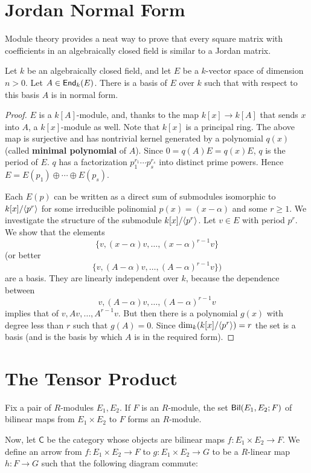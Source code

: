 \appendix 
\section{Jordan Normal Form}
Module theory provides a neat way to prove that every square matrix with coefficients in an algebraically closed field is similar to a Jordan matrix.  

\begin{thm}
Let $k$ be an algebraically closed field, and let $E$ be a $k$-vector space of dimension $n>0$. 
Let $A \in \operatorname{\sf{End}}_{k}(E)$. 
There is a basis of $E$ over $k$ such that with respect to this basis $A$ is in normal form. 

\begin{proof}
$E$ is a $k[A]$-module, and, thanks to the map $k[x] \to k[A]$ that sends $x$ into $A$, a $k[x]$-module as well. 
Note that $k[x]$ is a principal ring. The above map is surjective and has nontrivial kernel generated by a polynomial $q(x)$ (called \textbf{minimal polynomial} of $A$). 
Since $0=q(A)E=q(x)E$, $q$ is the period of $E$. 
$q$ has a factorization $p_1 ^{r_1} \cdots p_s ^{r_s}$ into distinct prime powers. 
Hence $E = E(p_1) \oplus \cdots \oplus E(p_s)$. 

Each $E(p)$ can be written as a direct sum of submodules isomorphic to $k[x]/\langle p^r\rangle$ for some irreducible polinomial $p(x)=(x-\alpha)$ and some $r \ge 1$. 
We investigate the structure of the submodule $k[x]/\langle p^r\rangle$. Let $v \in E$ with period $p^r$. 
We show that the elements 
$$\{v, (x-\alpha)v, \ldots, (x-\alpha)^{r-1}v\}$$ 
(or better
$$\{v, (A-\alpha)v, \ldots, (A-\alpha)^{r-1}v\}\text{)}$$
are a basis. 
They are linearly independent over $k$, because the dependence between 
$$v, (A-\alpha)v, \ldots, (A-\alpha)^{r-1}v$$ 
implies that of $v, Av, \ldots, A^{r-1}v$. 
But then there is a polynomial $g(x)$ with degree less than $r$ such that $g(A)=0$. 
Since $\dim_k(k[x]/\langle p^r\rangle)=r $ the set is a basis (and is the basis by which $A$ is in the required form).  
\end{proof}
\end{thm}

\section{The Tensor Product} 
Fix a pair of $R$-modules $E_1,E_2$. 
If $F$ is an $R$-module, the set $\operatorname{\sf{Bil}}(E_1,E_2;F)$ of bilinear maps from $E_1 \times E_2$ to $F$ forms an $R$-module. 

Now, let $\textsf{C}$ be the category whose objects are bilinear maps $f: E_1 \times E_2 \to F$. We define an arrow from $f: E_1 \times E_2 \to F$ to $g: E_1 \times E_2 \to G$ to be a $R$-linear map $h: F \to G$ such that the following diagram commute: 

